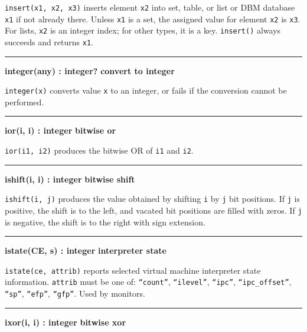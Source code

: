 \noindent
\texttt{insert(x1, x2, x3)} inserts element \texttt{x2} into set, table,
or list or DBM database \texttt{x1} if not already there. Unless
\texttt{x1} is a set, the assigned value for element \texttt{x2} is
\texttt{x3}. For lists, \texttt{x2} is an integer index; for other
types, it is a key. \texttt{insert()} always succeeds
and returns \texttt{x1}.

\bigskip\hrule\vspace{0.1cm}
\noindent
{\bf integer(any) : integer? } \hfill {\bf convert to integer}

\noindent
{}\texttt{integer(x)} converts value \texttt{x}
to an integer, or fails if the conversion cannot be performed.

\bigskip\hrule\vspace{0.1cm}
\noindent
{\bf ior(i, i) : integer } \hfill {\bf bitwise or}

\noindent
{}\texttt{ior(i1, i2)} produces the bitwise OR of
\texttt{i1} and \texttt{i2}.

\bigskip\hrule\vspace{0.1cm}
\noindent
{\bf ishift(i, i) : integer } \hfill {\bf bitwise shift}

\noindent
{}\texttt{ishift(i, j)} produces the value obtained by
shifting \texttt{i} by \texttt{j} bit positions.
If \texttt{j} is positive, the shift is to the left, and vacated bit
positions are filled with zeros.
If \texttt{j} is negative, the shift is to the right with sign extension. 

\bigskip\hrule\vspace{0.1cm}
\noindent
{\bf istate(CE, s) : integer } \hfill {\bf interpreter state}

\noindent
\texttt{istate(ce, attrib)} reports selected virtual machine interpreter
state information. \texttt{attrib} must be one of:
\texttt{{\textquotedblleft}count{\textquotedblright}},
\texttt{{\textquotedblleft}ilevel{\textquotedblright}},
\texttt{{\textquotedblleft}ipc{\textquotedblright}},
\texttt{{\textquotedblleft}ipc\_offset{\textquotedblright}},
\texttt{{\textquotedblleft}sp{\textquotedblright}},
\texttt{{\textquotedblleft}efp{\textquotedblright}},
\texttt{{\textquotedblleft}gfp{\textquotedblright}}. Used by monitors.

\bigskip\hrule\vspace{0.1cm}
\noindent
{\bf ixor(i, i) : integer } \hfill {\bf bitwise xor}

